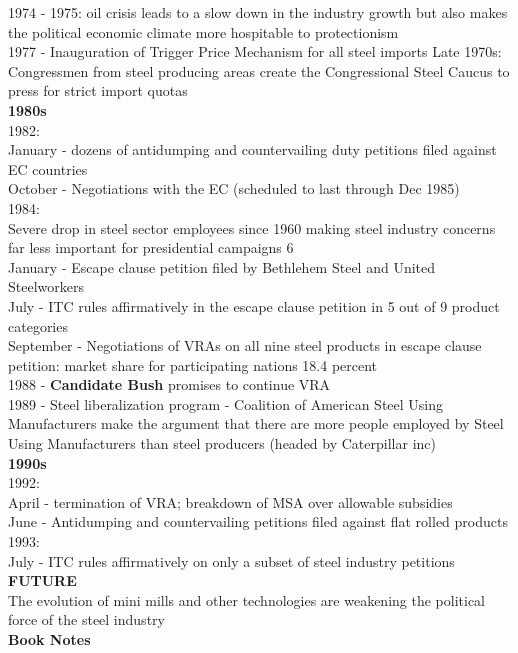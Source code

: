 \documentclass[10pt]{article}
\begin{document}
1974 - 1975: oil crisis leads to a slow down in the industry growth but also makes the political economic climate more hospitable to protectionism\\  
1977 - Inauguration of Trigger Price Mechanism for all steel imports
Late 1970s: Congressmen from steel producing areas create the Congressional Steel Caucus to press for strict import quotas\\
\normalsize\textbf{1980s}\\
1982:\\ 
January - dozens of antidumping and countervailing duty petitions filed against EC countries\\
October - Negotiations with the EC (scheduled to last through Dec 1985)\\
1984:\\
Severe drop in steel sector employees since 1960 making steel industry concerns far less important for presidential campaigns 6\\
January - Escape clause petition filed by Bethlehem Steel and United Steelworkers\\ 
July - ITC rules affirmatively in the escape clause petition in 5 out of 9 product categories\\
September - Negotiations of VRAs on all nine steel products in escape clause petition: market share for participating nations 18.4 percent \\
1988 - \textbf{Candidate Bush} promises to continue VRA\\
1989 - Steel liberalization program - Coalition of American Steel Using Manufacturers make the argument that there are more people employed by Steel Using Manufacturers than steel producers (headed by Caterpillar inc)\\ 
\normalsize\textbf{1990s}\\ 
1992:\\
April - termination of VRA; breakdown of MSA over allowable subsidies\\
June - Antidumping and countervailing petitions filed against flat rolled products\\
1993:\\
July - ITC rules affirmatively on only a subset of steel industry petitions\\
\normalsize\textbf{FUTURE}\\ 
The evolution of mini mills and other technologies are weakening the political force of the steel industry\\
\large\textbf{Book Notes}\\
\end{document}
